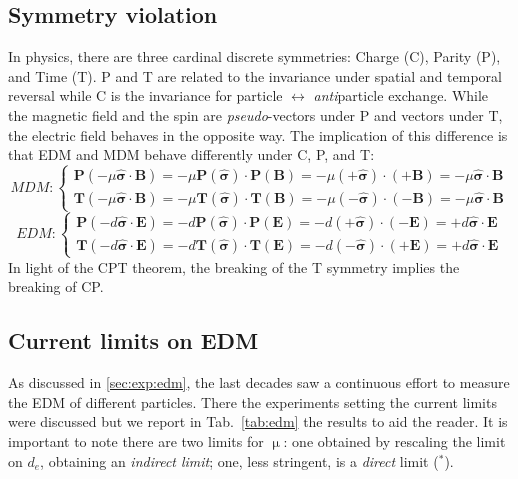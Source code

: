 \begin{refsection}
    \subsection{Symmetry violation}
        In physics, there are three cardinal discrete symmetries: Charge (C), Parity (P), and Time (T).
        P and T are related to the invariance under spatial and temporal reversal while C is the invariance for particle $\leftrightarrow$ \textit{anti}particle exchange.
        While the magnetic field and the spin are \textit{pseudo}-vectors under P and vectors under T, the electric field behaves in the opposite way.
        The implication of this difference is that EDM and MDM behave differently under C, P, and T:
        \begin{equation}
            MDM : 
            \begin{cases}
                \textbf{P} (-\mu\bm{\hat{\sigma}\cdot B}) = -\mu \bm{P(\hat{\sigma}) \cdot P(B)} = -\mu\bm{(+\hat{\sigma})\cdot (+B)} = -\mu\bm{\hat{\sigma}\cdot B} \\
                \textbf{T} (-\mu\bm{\hat{\sigma}\cdot B}) = -\mu \bm{T(\hat{\sigma}) \cdot T(B)} = -\mu\bm{(-\hat{\sigma})\cdot (-B)} = -\mu\bm{\hat{\sigma}\cdot B} 
            \end{cases}
        \end{equation}
        \begin{equation}
            EDM : 
            \begin{cases}
                \textbf{P} (-d\bm{\hat{\sigma}\cdot E}) = -d \bm{P(\hat{\sigma}) \cdot P(E)} = -d\bm{(+\hat{\sigma})\cdot (-E)} = +d\bm{\hat{\sigma}\cdot E} \\
                \textbf{T} (-d\bm{\hat{\sigma}\cdot E}) = -d \bm{T(\hat{\sigma}) \cdot T(E)} = -d\bm{(-\hat{\sigma})\cdot (+E)} = +d\bm{\hat{\sigma}\cdot E}          
            \end{cases}
        \end{equation}
        In light of the CPT theorem, the breaking of the T symmetry implies the breaking of CP.
        
    \subsection{Current limits on EDM}
        As discussed in \ref{sec:exp:edm}, the last decades saw a continuous effort to measure the EDM of different particles.
        There the experiments setting the current limits were discussed but we report in Tab.~\ref{tab:edm} the results to aid the reader.
        It is important to note there are two limits for $\upmu$: one obtained by rescaling the limit on $d_e$, obtaining an \textit{indirect limit}; one, less stringent, is a \textit{direct} limit ($^*$).
        

\end{refsection}
